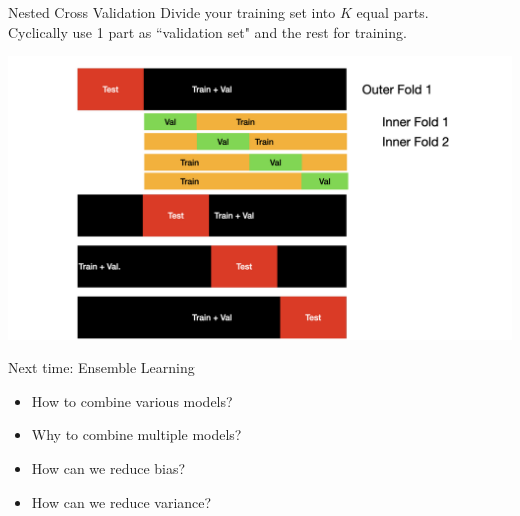 \documentclass[usenames,dvipsnames]{beamer}
\begin{document}
\begin{frame}{Nested Cross Validation}
	Divide your training set into $K$ equal 	parts.\\
	Cyclically use 1 part as ``validation set" and the rest for training.\\
	\begin{center}
	\includegraphics[scale=0.18]{./cross-validation/cross-validation.002.jpeg}
	\end{center}
	\end{frame}
	


\begin{frame}{Next time: Ensemble Learning}
\begin{itemize}
\item How to combine various models?
\item Why to combine multiple models?
\item How can we reduce bias?
\item How can we reduce variance?
\end{itemize}
\end{frame}
\end{document}
